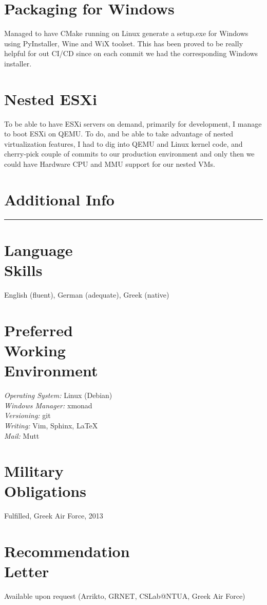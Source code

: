 \documentclass[margin,centered]{res}
\begin{document}
\begin{resume}
\section{\sc Packaging for Windows}
Managed to have CMake running on Linux generate a setup.exe for Windows using
PyInstaller, Wine and WiX toolset. This has been proved to be really helpful for
out CI/CD since on each commit we had the corresponding Windows installer.

\section{\sc Nested ESXi}
To be able to have ESXi servers on demand, primarily for development, I manage
to boot ESXi on QEMU. To do, and be able to take advantage of nested
virtualization features, I had to dig into QEMU and Linux kernel code, and
cherry-pick couple of commits to our production environment and only then we
could have Hardware CPU and MMU support for our nested VMs.


\section{Additional Info}
\rule[3pt]{\textwidth}{0.4pt}

\section{\sc Language\\Skills}
English (fluent), German (adequate), Greek (native)

\section{\sc Preferred\\Working\\Environment}
\textit{Operating System:} Linux (Debian)\\
\textit{Windows Manager:} xmonad\\
\textit{Versioning:} git\\
\textit{Writing:} Vim, Sphinx, \LaTeX\\
\textit{Mail:} Mutt

\section{\sc Military\\Obligations}
Fulfilled, Greek Air Force, 2013

\section{\sc Recommendation\\Letter}
Available upon request (Arrikto, GRNET, CSLab@NTUA, Greek Air Force)

\end{resume}

\def\enoteheading{\section{Notes}\rule[0pt]{\textwidth}{0.4pt}}
\parskip=2pt
\theendnotes
\end{document}
